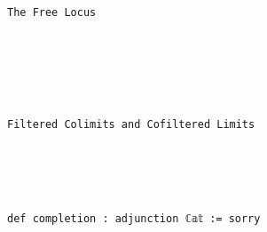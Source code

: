 \documentclass{book}
\theoremstyle{definition}
\newcounter{lcounter}
\renewcommand{\chapter}[1]{
\newpage
{
\Huge 
\begin{center}
\ \\
\ \\
\thispagestyle{empty}
\texttt{#1}
\end{center}}
\ \\
\ \\
}
\begin{document}
\chapter{The Free Locus}



\chapter{Filtered Colimits and Cofiltered Limits}

\begin{center}
\begin{tcolorbox}[width=5in,colback={white},title={\begin{center}\texttt{Lean \thelcounter} \addtocounter{lcounter}{1}  \end{center}},colbacktitle=Blue,coltitle=black]
\begin{verbatim}

def completion : adjunction ℂ𝕒𝕥 := sorry

\end{verbatim}
\end{tcolorbox}
\end{center}
\end{document}
